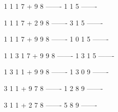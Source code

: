 \nextt
\begin{console}[commandchars=\\\{\}]
  1 1
    1 7
+   9 8
-------
  1 1 5     
-------
\end{console}

\nextt
\begin{console}[commandchars=\\\{\}]
  1 1
    1 7
+ 2 9 8
-------
  3 1 5     
-------
\end{console}

\nextt
\begin{console}[commandchars=\\\{\}]
  1 1
    1 7
+ 9 9 8
-------
1 0 1 5     
-------
\end{console}

\nextt
\begin{console}[commandchars=\\\{\}]
  1 1
  3 1 7
+ 9 9 8
-------
1 3 1 5     
-------
\end{console}

\nextt
\begin{console}[commandchars=\\\{\}]
  1 
  3 1 1
+ 9 9 8
-------
1 3 0 9     
-------
\end{console}

\nextt
\begin{console}[commandchars=\\\{\}]
  3 1 1
+ 9 7 8
-------
1 2 8 9     
-------
\end{console}

\nextt
\begin{console}[commandchars=\\\{\}]
  3 1 1
+ 2 7 8
-------
  5 8 9     
-------
\end{console}




